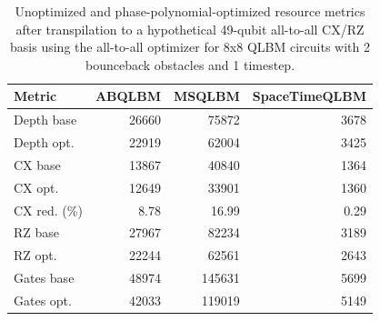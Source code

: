 \begin{table}[ht]
\centering
\begin{tabular}{lrrr}
\hline
Metric & ABQLBM & MSQLBM & SpaceTimeQLBM \\
\hline
Depth base & 26660 & 75872 & 3678 \\
Depth opt. & 22919 & 62004 & 3425 \\
CX base & 13867 & 40840 & 1364 \\
CX opt. & 12649 & 33901 & 1360 \\
CX red. (\%) & 8.78 & 16.99 & 0.29 \\
RZ base & 27967 & 82234 & 3189 \\
RZ opt. & 22244 & 62561 & 2643 \\
Gates base & 48974 & 145631 & 5699 \\
Gates opt. & 42033 & 119019 & 5149 \\
\hline
\end{tabular}
\caption{Unoptimized and phase-polynomial-optimized resource metrics after transpilation to a hypothetical 49-qubit all-to-all CX/RZ basis using the all-to-all optimizer for 8x8 QLBM circuits with 2 bounceback obstacles and 1 timestep.}
\label{tab:phase-poly-optimization-comparison-8x8-obs2-t1-all-to-all}
\end{table}
